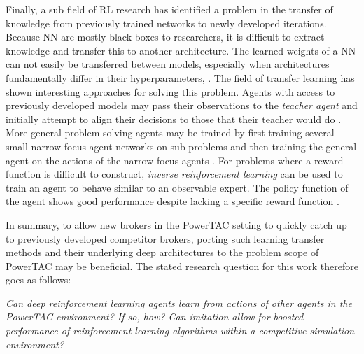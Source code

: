 Finally, a sub field of \ac{RL} research has identified a problem in the transfer of knowledge from previously trained
networks to newly developed iterations. Because \ac{NN} are mostly black boxes to researchers, it is difficult to
extract knowledge and transfer this to another architecture. The learned weights of a \ac{NN} can not easily be
transferred between models, especially when architectures fundamentally differ in their hyperparameters, . The field of
transfer learning has shown interesting approaches for solving this problem. Agents with access to previously developed
models may pass their observations to the \emph{teacher agent} and initially attempt to align their decisions to those
that their teacher would do \cite[]{schmitt2018kickstarting}. More general problem solving agents may be trained by
first training several small narrow focus agent networks on sub problems and then training the general agent on the
actions of the narrow focus agents \cite[]{parisotto2015actor}. For problems where a reward function is difficult to
construct, \emph{inverse reinforcement learning} can be used to train an agent to behave similar to an observable
expert. The policy function of the agent shows good performance despite lacking a specific reward function
\cite[]{NG2004Apprentice}.

In summary, to allow new brokers in the \ac{PowerTAC} setting to quickly catch up to previously developed competitor brokers,
porting such learning transfer methods and their underlying deep architectures to the problem scope of \ac{PowerTAC}
may be beneficial. The stated research question for this work therefore goes as follows:

\emph{Can deep reinforcement learning agents learn from actions of other agents in the \ac{PowerTAC} environment? If so, how? Can imitation allow for
boosted performance of reinforcement learning algorithms within a competitive simulation environment?}



